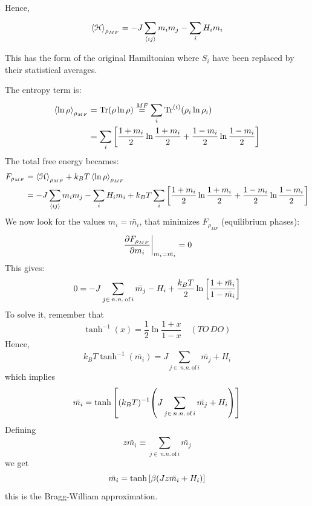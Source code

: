 \documentclass[../main/main.tex]{subfiles}
\begin{document}
Hence,
\begin{equation}
  \expval{\mathcal{H}}_{\rho _{MF}} = -J \sum_{\expval{ij} }^{} m_i m_j - \sum_{i}^{} H_i m_i
\end{equation}
\begin{remark}
This has the form of the original Hamiltonian where \( S_i \) have been replaced by their statistical averages.
\end{remark}
The entropy term is:
\begin{equation}
\begin{split}
  \expval{\ln{\rho } }_{\rho _{MF}} & = \Tr(\rho \ln{\rho } )  \overset{MF}{=} \sum_{i}^{} \Tr^{(i)} (\rho _i \ln{\rho _i} ) \\
 &  = \sum_{i}^{} \qty[ \frac{1+m_i}{2} \ln{\frac{1+m_i}{2}} + \frac{1-m_i}{2} \ln{\frac{1-m_i}{2}} ]
\end{split}
\end{equation}
The total free energy becames:
\begin{equation}
\begin{split}
  F_{\rho _{MF}} &= \expval{\mathcal{H}}_{\rho _{MF}} + k_B T \expval{\ln{\rho } }_{\rho _{MF}} \\
  & = - J \sum_{\expval{ij} }^{} m_i m_j - \sum_{i}^{} H_i m_i
  + k_B T   \sum_{i}^{} \qty[ \frac{1+m_i}{2} \ln{\frac{1+m_i}{2}} + \frac{1-m_i}{2} \ln{\frac{1-m_i}{2}} ]
\end{split}
\end{equation}
We now look for the values \( m_i = \bar{m_i}  \), that minimizes \( F_{\rho _{MF}} \) (equilibrium phases):
\begin{equation}
 \eval{ \pdv{F_{\rho _{MF}} }{m_i} }_{m_i = \bar{m_i} } = 0
\end{equation}
This gives:
\begin{equation}
  0 = - J \sum_{j \in \, n.n. \,\text{of}\, i}^{} \bar{m_j} - H_i + \frac{k_B T}{2} \ln{\qty[\frac{1+\bar{m_i} }{1- \bar{m_i} }] }
\end{equation}
To solve it, remember that
\begin{equation}
  \tanh^{-1} (x) = \frac{1}{2} \ln{\frac{1+x}{1-x}} \quad (TO\, DO)
\end{equation}
Hence,
\begin{equation}
  k_B T \tanh^{-1} ( \bar{m_i} ) = J \sum_{j \in \, n.n. \,\text{of}\, i}^{} \bar{m_j} + H_i
\end{equation}
which implies
\begin{equation}
  \bar{m_i} = \tanh \qty[(k_B T)^{-1} \qty(J \sum_{j \in \, n.n. \,\text{of}\, i}^{} \bar{m_j} + H_i ) ]
\end{equation}
Defining
\begin{equation}
  z \bar{m_i} \equiv  \sum_{j \in \, n.n. \,\text{of}\, i}^{} \bar{m_j}
\end{equation}
we get
\begin{equation}
  \bar{m_i} = \tanh \qty[\beta \qty(Jz \bar{m_i} +H_i) ]
\end{equation}
this is the Bragg-William approximation.
\end{document}

